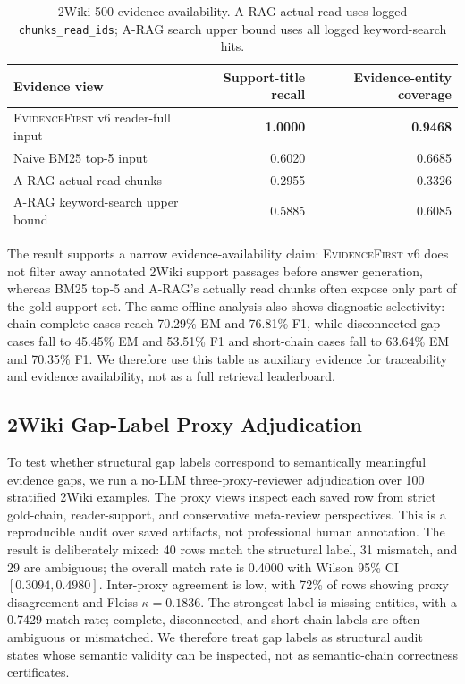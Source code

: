 \documentclass[runningheads]{llncs}
\newcommand{\sys}{\textsc{EvidenceFirst}\xspace}
\begin{document}
\begin{table}[t]
\centering
\caption{2Wiki-500 evidence availability. A-RAG actual read uses logged
\texttt{chunks\_read\_ids}; A-RAG search upper bound uses all logged keyword-search
hits.}
\label{tab:2wiki_support_availability}
\small
\begin{tabular}{lrr}
\toprule
Evidence view & Support-title recall & Evidence-entity coverage \\
\midrule
\sys v6 reader-full input & \textbf{1.0000} & \textbf{0.9468} \\
Naive BM25 top-5 input & 0.6020 & 0.6685 \\
A-RAG actual read chunks & 0.2955 & 0.3326 \\
A-RAG keyword-search upper bound & 0.5885 & 0.6085 \\
\bottomrule
\end{tabular}
\end{table}

The result supports a narrow evidence-availability claim: \sys v6 does not
filter away annotated 2Wiki support passages before answer generation, whereas
BM25 top-5 and A-RAG's actually read chunks often expose only part of the gold
support set. The same offline analysis also shows diagnostic selectivity:
chain-complete cases reach 70.29\% EM and 76.81\% F1, while disconnected-gap
cases fall to 45.45\% EM and 53.51\% F1 and short-chain cases fall to 63.64\%
EM and 70.35\% F1. We therefore use this table as auxiliary evidence for
traceability and evidence availability, not as a full retrieval leaderboard.

\subsection{2Wiki Gap-Label Proxy Adjudication}

To test whether structural gap labels correspond to semantically meaningful
evidence gaps, we run a no-LLM three-proxy-reviewer adjudication over 100
stratified 2Wiki examples. The proxy views inspect each saved row from strict
gold-chain, reader-support, and conservative meta-review perspectives. This is a
reproducible audit over saved artifacts, not professional human annotation. The
result is deliberately mixed: 40 rows match the structural label, 31 mismatch,
and 29 are ambiguous; the overall match rate is 0.4000 with Wilson 95\% CI
$[0.3094,0.4980]$. Inter-proxy agreement is low, with 72\% of rows showing proxy
disagreement and Fleiss $\kappa=0.1836$. The strongest label is
missing-entities, with a 0.7429 match rate; complete, disconnected, and
short-chain labels are often ambiguous or mismatched. We therefore treat gap
labels as structural audit states whose semantic validity can be inspected, not
as semantic-chain correctness certificates.
\end{document}
